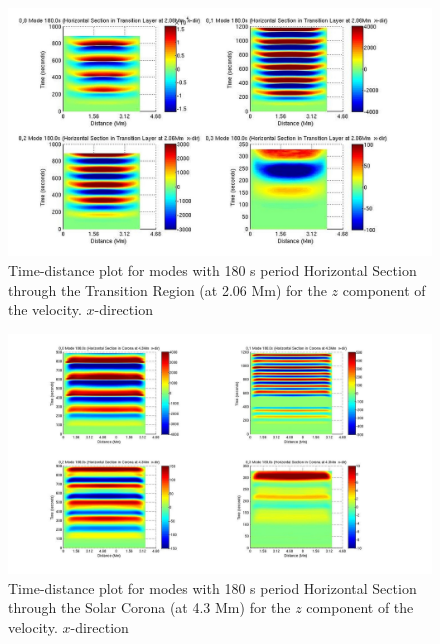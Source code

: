 \documentclass[preprint,authoryear,12pt]{elsarticle}
\begin{document}
\begin{figure}[h]
\includegraphics[scale=0.5]{imrescale/dt_180_horiz_x_2p06Mm.jpg}
\caption{Time-distance plot for modes with 180 s period Horizontal Section through the Transition Region (at 2.06 Mm) for the $z$  component of the velocity. $x$-direction}
\label{Fig15}
\end{figure}

\begin{figure}[h]
\includegraphics[scale=0.5]{imrescale/dt_180_horiz_x_4p3Mm.jpg}
\caption{Time-distance plot for modes with 180 s period Horizontal Section through the Solar Corona (at 4.3 Mm) for the $z$ component of the velocity. $x$-direction}
\label{Fig16}
\end{figure}
\end{document}
